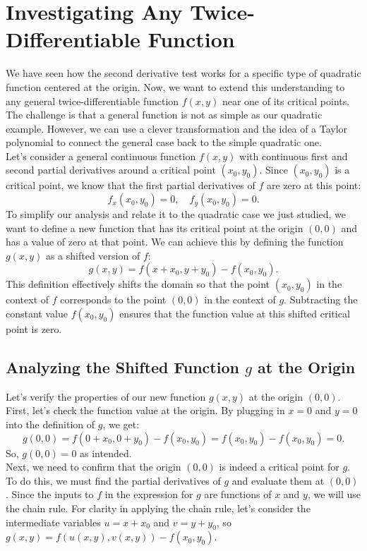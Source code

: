\documentclass{article}
\begin{document}
\section{Investigating Any Twice-Differentiable Function}

We have seen how the second derivative test works for a specific type of quadratic function centered at the origin. Now, we want to extend this understanding to any general twice-differentiable function \( f(x,y) \) near one of its critical points. The challenge is that a general function is not as simple as our quadratic example. However, we can use a clever transformation and the idea of a Taylor polynomial to connect the general case back to the simple quadratic one. \\

Let's consider a general continuous function \( f(x,y) \) with continuous first and second partial derivatives around a critical point \( (x_{0},y_{0}) \). Since \( (x_{0},y_{0}) \) is a critical point, we know that the first partial derivatives of \( f \) are zero at this point:
\[
	f_{x}(x_{0},y_{0}) = 0, \quad f_{y}(x_{0},y_{0}) = 0.
\]
To simplify our analysis and relate it to the quadratic case we just studied, we want to define a new function that has its critical point at the origin \( (0,0) \) and has a value of zero at that point. We can achieve this by defining the function \( g(x,y) \) as a shifted version of \( f \):
\[
	g(x,y) = f(x + x_{0}, y + y_{0}) - f(x_{0}, y_{0}).
\]
This definition effectively shifts the domain so that the point \( (x_{0},y_{0}) \) in the context of \( f \) corresponds to the point \( (0,0) \) in the context of \( g \). Subtracting the constant value \( f(x_{0}, y_{0}) \) ensures that the function value at this shifted critical point is zero.

\subsection{Analyzing the Shifted Function \( g \) at the Origin}

Let's verify the properties of our new function \( g(x,y) \) at the origin \( (0,0) \). First, let's check the function value at the origin. By plugging in \( x=0 \) and \( y=0 \) into the definition of \( g \), we get:
\[
	g(0, 0) = f(0 + x_{0}, 0 + y_{0}) - f(x_{0}, y_{0}) = f(x_{0}, y_{0}) - f(x_{0}, y_{0}) = 0.
\]
So, \( g(0,0) = 0 \) as intended. \\

Next, we need to confirm that the origin \( (0,0) \) is indeed a critical point for \( g \). To do this, we must find the partial derivatives of \( g \) and evaluate them at \( (0,0) \). Since the inputs to \( f \) in the expression for \( g \) are functions of \( x \) and \( y \), we will use the chain rule. For clarity in applying the chain rule, let's consider the intermediate variables \( u = x + x_{0} \) and \( v = y + y_{0} \), so \( g(x,y) = f(u(x,y), v(x,y)) - f(x_{0},y_{0}) \). \\
\end{document}
